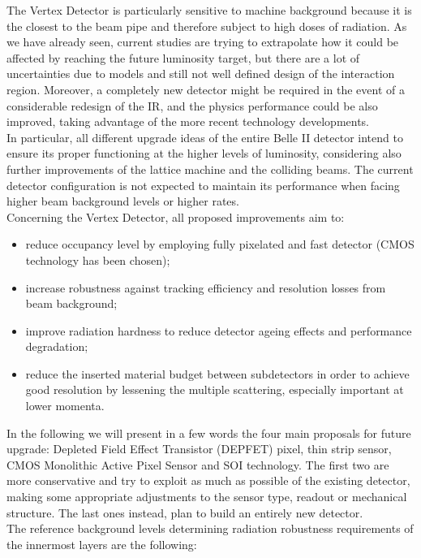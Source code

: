 The Vertex Detector is particularly sensitive to machine background because it is the closest to the beam pipe and therefore subject to high doses of radiation.
As we have already seen, current studies are trying to extrapolate how it could be affected by reaching the future luminosity target, but there are a lot of uncertainties due to models and still not well defined design of the interaction region. Moreover, a completely new detector might be required in the event of a considerable redesign of the IR, and the physics performance could be also improved, taking advantage of the more recent technology developments.\\
In particular, all different upgrade ideas of the entire Belle II detector intend to ensure its proper functioning at the higher levels of luminosity, considering also further improvements of the lattice machine and the colliding beams. The current detector configuration is not expected to maintain its performance when facing higher beam background levels or higher rates.\\

Concerning the Vertex Detector, all proposed improvements aim to:

\begin{itemize}
\item reduce occupancy level by employing fully pixelated and fast detector (CMOS technology has been chosen);
\item increase robustness against tracking efficiency and resolution losses from beam background;
\item improve radiation hardness to reduce detector ageing effects and performance degradation;
\item reduce the inserted material budget between subdetectors in order to achieve good resolution by lessening the multiple scattering, especially important at lower momenta.
\end{itemize}


In the following we will present in a few words the four main proposals for future upgrade: Depleted Field Effect Transistor (DEPFET) pixel, thin strip sensor, CMOS Monolithic Active Pixel Sensor and SOI technology.
The first two are more conservative and try to exploit as much as possible of the existing detector, making some appropriate adjustments to the sensor type, readout or mechanical structure. The last ones instead, plan to build an entirely new detector.\\

The reference background levels determining radiation robustness requirements of the innermost layers are the following:

